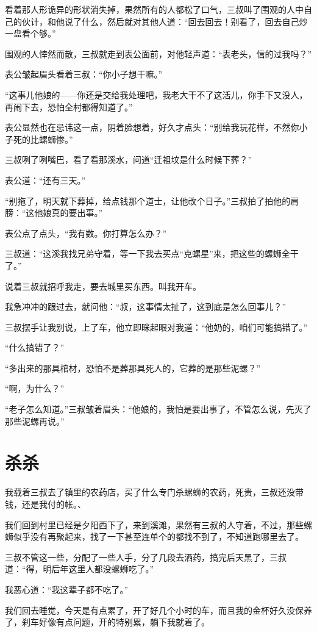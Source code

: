 看着那人形诡异的形状消失掉，果然所有的人都松了口气，三叔叫了围观的人中自己的伙计，和他说了什么，然后就对其他人道：“回去回去！别看了，回去自己炒一盘看个够。”

围观的人悻然而散，三叔就走到表公面前，对他轻声道：“表老头，信的过我吗？”

表公皱起眉头看着三叔：“你小子想干嘛。”

“这事儿他娘的——你还是交给我处理吧，我老大干不了这活儿，你手下又没人，再闹下去，恐怕全村都得知道了。”

表公显然也在忌讳这一点，阴着脸想着，好久才点头：“别给我玩花样，不然你小子死的比螺蛳惨。”

三叔咧了咧嘴巴，看了看那溪水，问道“迁祖坟是什么时候下葬？”

表公道：“还有三天。”

“别拖了，明天就下葬掉，给点钱那个道士，让他改个日子。”三叔拍了拍他的肩膀：“这他娘真的要出事。”

表公点了点头，“我有数。你打算怎么办？”

三叔道：“这溪我找兄弟守着，等一下我去买点“克螺星”来，把这些的螺蛳全干了。”

说着三叔就招呼我走，要去城里买东西。叫我开车。

我急冲冲的跟过去，就问他：“叔，这事情太扯了，这到底是怎么回事儿？”

三叔摆手让我别说，上了车，他立即眯起眼对我道：“他奶的，咱们可能搞错了。”

“什么搞错了？”

“多出来的那具棺材，恐怕不是葬那具死人的，它葬的是那些泥螺？”

“啊，为什么？”

“老子怎么知道。”三叔皱着眉头：“他娘的，我怕是要出事了，不管怎么说，先灭了那些泥螺再说。”

\chapter{杀杀}

我载着三叔去了镇里的农药店，买了什么专门杀螺蛳的农药，死贵，三叔还没带钱，还是我付的帐。、

我们回到村里已经是夕阳西下了，来到溪滩，果然有三叔的人守着，不过，那些螺蛳似乎没有再聚起来，找了一下甚至连单个的都找不到了，不知道跑哪里去了。

三叔不管这一些，分配了一些人手，分了几段去洒药，搞完后天黑了，三叔道：“得，明后年这里人都没螺蛳吃了。”

我恶心道：“我这辈子都不吃了。”

我们回去睡觉，今天是有点累了，开了好几个小时的车，而且我的金杯好久没保养了，刹车好像有点问题，开的特别累，躺下我就着了。

